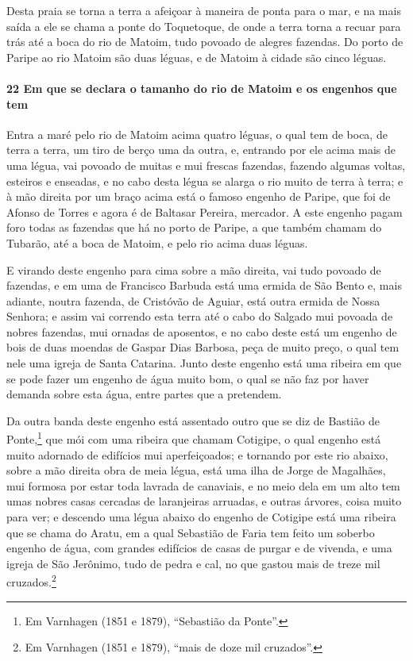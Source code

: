 \begin{linenumbers}
Desta praia se torna a terra a afeiçoar à maneira de ponta para o mar, e na mais saída a
ele se chama a ponte do Toquetoque, de onde a terra torna a recuar para trás até a boca do
rio de Matoim, tudo povoado de alegres fazendas. Do porto de Paripe ao rio Matoim são duas
léguas, e de Matoim à cidade são cinco léguas.

\paragraph{22 Em que se declara o tamanho do rio de Matoim e os engenhos que tem}\quad
Entra a maré pelo rio de Matoim acima quatro léguas, o qual tem de boca, de terra a terra,
um tiro de berço uma da outra, e, entrando por ele acima mais de uma légua, vai povoado de
muitas e mui frescas fazendas, fazendo algumas voltas, esteiros e enseadas, e no cabo
desta légua se alarga o rio muito de terra à terra; e à mão direita por um braço acima
está o famoso engenho de Paripe, que foi de Afonso de Torres e agora é de Baltasar
Pereira, mercador. A este engenho pagam foro todas as fazendas que há no porto de Paripe,
a que também chamam do Tubarão, até a boca de Matoim, e pelo rio acima duas léguas.

E virando deste engenho para cima sobre a mão direita, vai tudo povoado de fazendas, e em
uma de Francisco Barbuda está uma ermida de São Bento e, mais adiante, noutra fazenda, de
Cristóvão de Aguiar, está outra ermida de Nossa Senhora; e assim vai correndo esta terra
até o cabo do Salgado mui povoada de nobres fazendas, mui ornadas de aposentos, e no cabo
deste está um engenho de bois de duas moendas de Gaspar Dias Barbosa, peça de muito preço,
o qual tem nele uma igreja de Santa Catarina. Junto deste engenho está uma ribeira em que
se pode fazer um engenho de água muito bom, o qual se não faz por haver demanda sobre esta
água, entre partes que a pretendem.

Da outra banda deste engenho está assentado outro que se diz de Bastião de
Ponte,\footnote{ Em Varnhagen (1851 e 1879), ``Sebastião da Ponte''.} que mói com uma
ribeira que chamam Cotigipe, o qual engenho está muito adornado de edifícios mui
aperfeiçoados; e tornando por este rio abaixo, sobre a mão direita obra de meia légua,
está uma ilha de Jorge de Magalhães, mui formosa por estar toda lavrada de canaviais, e no
meio dela em um alto tem umas nobres casas cercadas de laranjeiras arruadas, e outras
árvores, coisa muito para ver; e descendo uma légua abaixo do engenho de Cotigipe está uma
ribeira que se chama do Aratu, em a qual Sebastião de Faria tem feito um soberbo engenho
de água, com grandes edifícios de casas de purgar e de vivenda, e uma igreja de São
Jerônimo, tudo de pedra e cal, no que gastou mais de treze mil cruzados.\footnote{ Em
Varnhagen (1851 e 1879), ``mais de doze mil cruzados''.}


\end{linenumbers}
